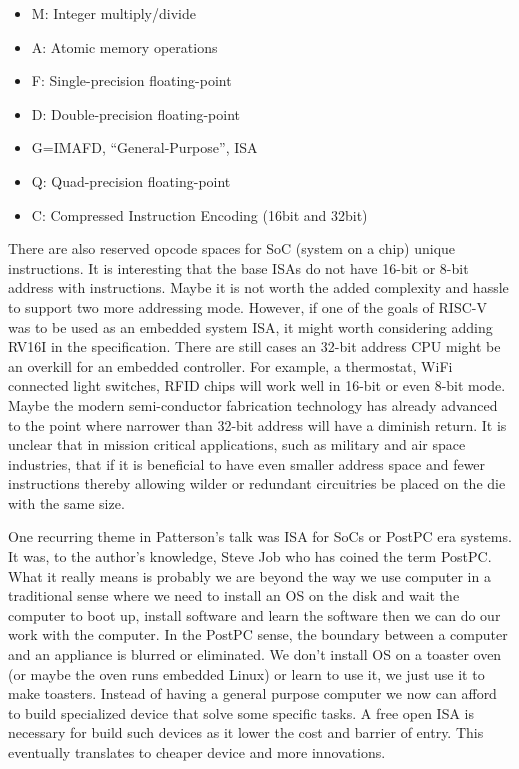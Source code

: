 \documentclass[a4paper, 11pt]{article} %
\begin{document}
\begin{itemize}
	\item  M: Integer multiply/divide
	\item  A: Atomic memory operations
	\item  F: Single-precision floating-point
	\item  D: Double-precision floating-point
	\item  G=IMAFD, “General-Purpose”, ISA
	\item  Q: Quad-precision floating-point
	\item  C: Compressed Instruction Encoding (16bit and 32bit)
\end{itemize}


There are also reserved opcode spaces for SoC (system on a chip) unique instructions. It is interesting that the base ISAs do not have 16-bit or 8-bit address with instructions. Maybe it is not worth the added complexity and hassle to support two more addressing mode. However, if one of the goals of RISC-V was to be used as an embedded system ISA, it might worth considering adding RV16I in the specification. There are still cases an 32-bit address CPU might be an overkill for an embedded controller. For example, a thermostat, WiFi connected light switches, RFID chips will work well in 16-bit or even 8-bit mode. Maybe the modern semi-conductor fabrication technology has already advanced to the point where narrower than 32-bit address will have a diminish return. It is unclear that in mission critical applications, such as military and air space industries, that if it is beneficial to have even  smaller address  space and fewer instructions thereby allowing wilder or redundant circuitries be placed on the die with the same size. 


One recurring theme in Patterson's talk was ISA for SoCs or PostPC era systems. It was, to the author's knowledge,  Steve Job who has coined the term PostPC. What it really means is probably we are beyond the way we use computer in a traditional sense where we need to install an OS on the disk and wait the computer to boot up, install software and learn the software then we can do our work with the computer. In the PostPC sense, the boundary between a computer and an appliance is blurred or eliminated. We don't install OS on a toaster oven (or maybe the oven runs embedded Linux) or learn to use it, we just use it to make toasters. Instead of having a general purpose computer we now can afford to build specialized device that solve some specific tasks. A free open ISA is necessary for build such devices as it lower the cost and barrier of entry. This eventually translates to cheaper device and more innovations. 
\end{document}

